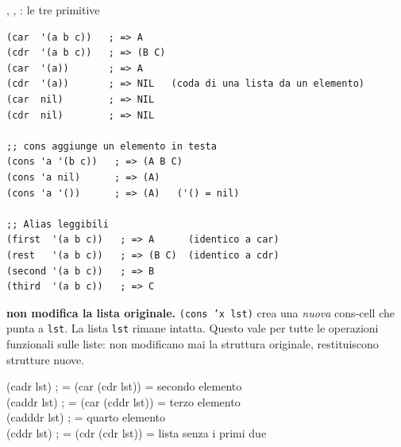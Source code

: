 \begin{concetto}{, , : le tre primitive}

\boxsep
{}
\end{concetto}

\begin{esempio}
\begin{lstlisting}
(car  '(a b c))   ; => A
(cdr  '(a b c))   ; => (B C)
(car  '(a))       ; => A
(cdr  '(a))       ; => NIL   (coda di una lista da un elemento)
(car  nil)        ; => NIL
(cdr  nil)        ; => NIL

;; cons aggiunge un elemento in testa
(cons 'a '(b c))   ; => (A B C)
(cons 'a nil)      ; => (A)
(cons 'a '())      ; => (A)   ('() = nil)

;; Alias leggibili
(first  '(a b c))   ; => A      (identico a car)
(rest   '(a b c))   ; => (B C)  (identico a cdr)
(second '(a b c))   ; => B
(third  '(a b c))   ; => C
\end{lstlisting}
\end{esempio}

\begin{attenzione}
\textbf{ non modifica la lista originale.}
\texttt{(cons 'x lst)} crea una \emph{nuova} cons-cell che punta a \texttt{lst}.
La lista \texttt{lst} rimane intatta.
Questo vale per tutte le operazioni funzionali sulle liste: non
modificano mai la struttura originale, restituiscono strutture nuove.

\end{attenzione}


\begin{sintassi}
(cadr lst)    ; = (car (cdr lst))    = secondo elemento\\
(caddr lst)   ; = (car (cddr lst))   = terzo elemento\\
(cadddr lst)  ; = quarto elemento\\
(cddr lst)    ; = (cdr (cdr lst))    = lista senza i primi due
\end{sintassi}

